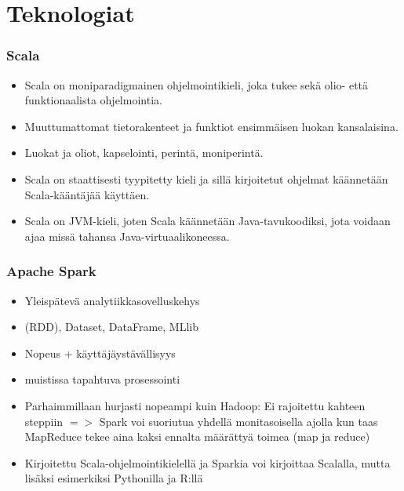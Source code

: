 \documentclass{beamer}
\begin{document}
\section{Teknologiat}

\begin{frame}
\frametitle{Scala}

\begin{itemize}
	\item Scala on moniparadigmainen ohjelmointikieli, joka tukee sekä olio- että funktionaalista ohjelmointia.
	\item Muuttumattomat tietorakenteet ja funktiot ensimmäisen luokan kansalaisina.
	\item Luokat ja oliot, kapselointi, perintä, moniperintä.
	\item Scala on staattisesti tyypitetty kieli ja sillä kirjoitetut ohjelmat käännetään Scala-kääntäjää käyttäen.
	\item Scala on JVM-kieli, joten Scala käännetään Java-tavukoodiksi, jota voidaan ajaa missä tahansa Java-virtuaalikoneessa.
\end{itemize}

\end{frame}


\begin{frame}
\frametitle{Apache Spark}

\begin{itemize}
	\item Yleispätevä analytiikkasovelluskehys
	\item (RDD), Dataset, DataFrame, MLlib
	\item Nopeus + käyttäjäystävällisyys
	\item muistissa tapahtuva prosessointi
	\item Parhaimmillaan hurjasti nopeampi kuin Hadoop: Ei rajoitettu kahteen steppiin $=>$ Spark voi suoriutua yhdellä monitasoisella ajolla kun taas MapReduce tekee aina kaksi ennalta määrättyä toimea (map ja reduce)
	\item Kirjoitettu Scala-ohjelmointikielellä ja Sparkia voi kirjoittaa Scalalla, mutta lisäksi esimerkiksi Pythonilla ja R:llä
\end{itemize}

\end{frame}

\end{document}
